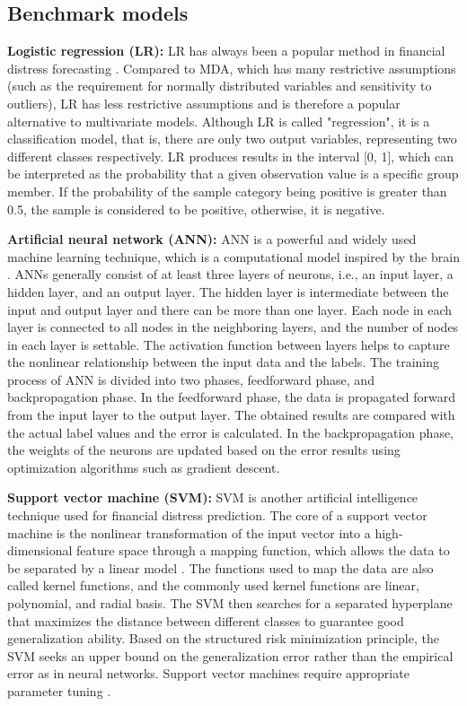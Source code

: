 \documentclass[review]{elsarticle}
\begin{document}
\subsection{Benchmark models}
\textbf{Logistic regression (LR):} LR has always been a popular method in financial distress forecasting \citep{Lessmann2015}. Compared to MDA, which has many restrictive assumptions (such as the requirement for normally distributed variables and sensitivity to outliers), LR has less restrictive assumptions and is therefore a popular alternative to multivariate models. Although LR is called "regression", it is a classification model, that is, there are only two output variables, representing two different classes respectively. LR produces results in the interval [0, 1], which can be interpreted as the probability that a given observation value is a specific group member. If the probability of the sample category being positive is greater than 0.5, the sample is considered to be positive, otherwise, it is negative.

\textbf{Artificial neural network (ANN):} ANN is a powerful and widely used machine learning technique, which is a computational model inspired by the brain \citep{Kohonen1988}. ANNs generally consist of at least three layers of neurons, i.e., an input layer, a hidden layer, and an output layer. The hidden layer is intermediate between the input and output layer and there can be more than one layer. Each node in each layer is connected to all nodes in the neighboring layers, and the number of nodes in each layer is settable. The activation function between layers helps to capture the nonlinear relationship between the input data and the labels. The training process of ANN is divided into two phases, feedforward phase, and backpropagation phase. In the feedforward phase, the data is propagated forward from the input layer to the output layer. The obtained results are compared with the actual label values and the error is calculated. In the backpropagation phase, the weights of the neurons are updated based on the error results using optimization algorithms such as gradient descent.

\textbf{Support vector machine (SVM):} SVM is another artificial intelligence technique used for financial distress prediction. The core of a support vector machine is the nonlinear transformation of the input vector into a high-dimensional feature space through a mapping function, which allows the data to be separated by a linear model \citep{Cortes1995}. The functions used to map the data are also called kernel functions, and the commonly used kernel functions are linear, polynomial, and radial basis. The SVM then searches for a separated hyperplane that maximizes the distance between different classes to guarantee good generalization ability. Based on the structured risk minimization principle, the SVM seeks an upper bound on the generalization error rather than the empirical error as in neural networks. Support vector machines require appropriate parameter tuning \citep{Huang2007}.
\end{document}

